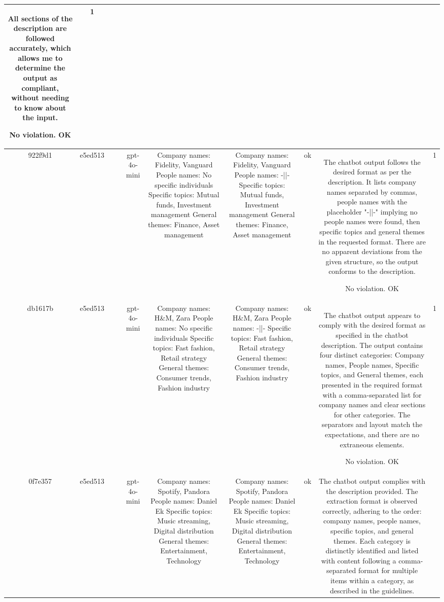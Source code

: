 \begin{table}[h!]
\begin{tabular}{|c|c|c|c|c|c|c|c|c|c|}
All sections of the description are followed accurately, which allows me to determine the output as compliant, without needing to know about the input.

No violation.
OK & 1\\
\hline
922f9d1 & e5ed513 &  &  & gpt-4o-mini & Company names: Fidelity, Vanguard
People names: No specific individuals
Specific topics: Mutual funds, Investment management
General themes: Finance, Asset management & Company names: Fidelity, Vanguard  
People names: -||-  
Specific topics: Mutual funds, Investment management  
General themes: Finance, Asset management   & ok & The chatbot output follows the desired format as per the description. It lists company names separated by commas, people names with the placeholder "-||-" implying no people names were found, then specific topics and general themes in the requested format. There are no apparent deviations from the given structure, so the output conforms to the description.

No violation.
OK & 1\\
\hline
db1617b & e5ed513 &  &  & gpt-4o-mini & Company names: H\&M, Zara
People names: No specific individuals
Specific topics: Fast fashion, Retail strategy
General themes: Consumer trends, Fashion industry & Company names: H\&M, Zara  
People names: -||-  
Specific topics: Fast fashion, Retail strategy  
General themes: Consumer trends, Fashion industry   & ok & The chatbot output appears to comply with the desired format as specified in the chatbot description. The output contains four distinct categories: Company names, People names, Specific topics, and General themes, each presented in the required format with a comma-separated list for company names and clear sections for other categories. The separators and layout match the expectations, and there are no extraneous elements.

No violation.
OK & 1\\
\hline
0f7e357 & e5ed513 &  &  & gpt-4o-mini & Company names: Spotify, Pandora
People names: Daniel Ek
Specific topics: Music streaming, Digital distribution
General themes: Entertainment, Technology & Company names: Spotify, Pandora  
People names: Daniel Ek  
Specific topics: Music streaming, Digital distribution  
General themes: Entertainment, Technology   & ok & The chatbot output complies with the description provided. The extraction format is observed correctly, adhering to the order: company names, people names, specific topics, and general themes. Each category is distinctly identified and listed with content following a comma-separated format for multiple items within a category, as described in the guidelines.


\end{tabular}
\end{table}
